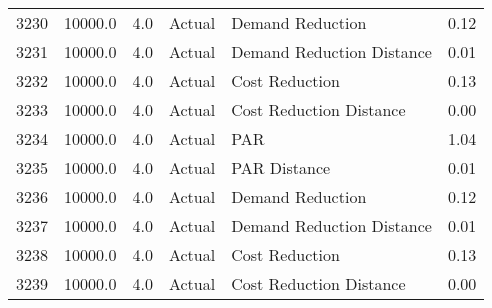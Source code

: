 \begin{longtable}{lrrllr}
3230 &      10000.0 &     4.0 &         Actual &           Demand Reduction &   0.12 \\
3231 &      10000.0 &     4.0 &         Actual &  Demand Reduction Distance &   0.01 \\
3232 &      10000.0 &     4.0 &         Actual &             Cost Reduction &   0.13 \\
3233 &      10000.0 &     4.0 &         Actual &    Cost Reduction Distance &   0.00 \\
3234 &      10000.0 &     4.0 &         Actual &                        PAR &   1.04 \\
3235 &      10000.0 &     4.0 &         Actual &               PAR Distance &   0.01 \\
3236 &      10000.0 &     4.0 &         Actual &           Demand Reduction &   0.12 \\
3237 &      10000.0 &     4.0 &         Actual &  Demand Reduction Distance &   0.01 \\
3238 &      10000.0 &     4.0 &         Actual &             Cost Reduction &   0.13 \\
3239 &      10000.0 &     4.0 &         Actual &    Cost Reduction Distance &   0.00 \\
\end{longtable}
